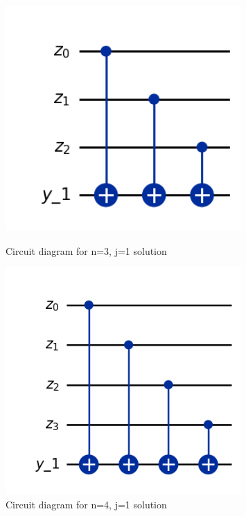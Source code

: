 \documentclass[12pt,a4paper]{article}
\begin{document}
\begin{figure}[t] 
    \begin{minipage}{.45\textwidth}
        \centering 
        \includegraphics[width=0.8\textwidth]{Figures/j1n3.png}
        \caption{Circuit diagram for n=3, j=1 solution} 
        \label{fig:n3j1} 
    \end{minipage}
    \qquad
    \begin{minipage}{.45\textwidth}
    \centering 
        \includegraphics[width=0.8\textwidth]{Figures/n4j1_circuit_diagram.png}
        \caption{Circuit diagram for n=4, j=1 solution} 
        \label{fig:n4j1} 
    \end{minipage}  
\end{figure}
\end{document}
